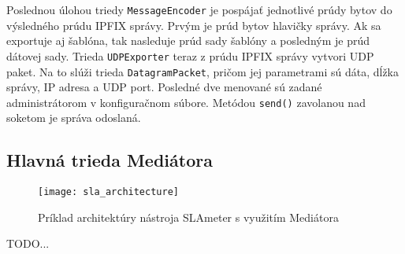 Poslednou úlohou triedy \verb|MessageEncoder| je pospájať jednotlivé prúdy bytov do výsledného prúdu IPFIX 
správy. Prvým je prúd bytov hlavičky správy. Ak sa exportuje aj šablóna, tak nasleduje prúd sady šablóny 
a posledným je prúd dátovej sady. Trieda \verb|UDPExporter| teraz z prúdu IPFIX správy vytvori 
UDP paket. Na to slúži trieda \verb|DatagramPacket|, pričom jej parametrami sú dáta, dĺžka správy, 
IP adresa a UDP port. Posledné dve menované sú zadané administrátorom v konfiguračnom súbore. Metódou 
\verb|send()| zavolanou nad soketom je správa odoslaná.





\subsection{Hlavná trieda Mediátora}

\begin{figure}[ht!]
\centering
\texttt{[image: sla\_architecture]}
\caption{Príklad architektúry nástroja SLAmeter s využitím Mediátora}\label{o:sla_architecture}
\end{figure}



TODO...

